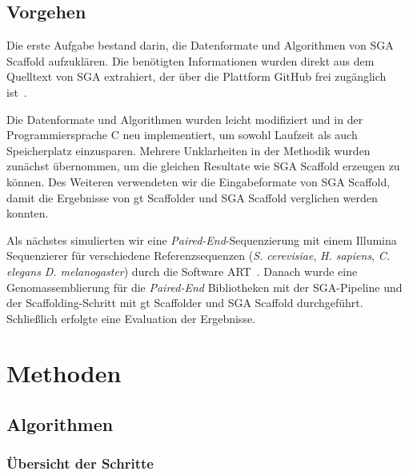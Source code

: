 \documentclass[a4paper,11pt,parskip,abstract=on]{scrartcl}
\begin{document}
\subsection{Vorgehen}
Die erste Aufgabe bestand darin, die Datenformate und Algorithmen
von SGA Scaffold aufzuklären. Die benötigten Informationen
wurden direkt aus dem Quelltext von SGA extrahiert, der über die
Plattform GitHub frei zugänglich ist~\cite{source}.

Die Datenformate und Algorithmen wurden leicht modifiziert und in
der Programmiersprache C neu implementiert, um sowohl Laufzeit
als auch Speicherplatz einzusparen. Mehrere Unklarheiten in der
Methodik wurden zunächst übernommen, um die gleichen Resultate wie
SGA Scaffold erzeugen zu können. Des Weiteren verwendeten wir die
Eingabeformate von SGA Scaffold, damit die Ergebnisse von gt Scaffolder
und SGA Scaffold verglichen werden konnten.

Als nächstes simulierten wir eine \textit{Paired-End}-Sequenzierung mit
einem Illumina Sequenzierer für verschiedene Referenzsequenzen
(\textit{S. cerevisiae}, \textit{H. sapiens}, \textit{C. elegans}
 \textit{D. melanogaster}) durch die Software ART~\cite{Huang:2012kq}.
Danach wurde eine Genomassemblierung für die \textit{Paired-End}
Bibliotheken mit der SGA-Pipeline und der Scaffolding-Schritt
mit gt Scaffolder und SGA Scaffold durchgeführt. Schließlich erfolgte
eine Evaluation der Ergebnisse.

\section{Methoden}
\label{sec: Methoden}

\subsection{Algorithmen}
\subsubsection{Übersicht der Schritte}
\end{document}
